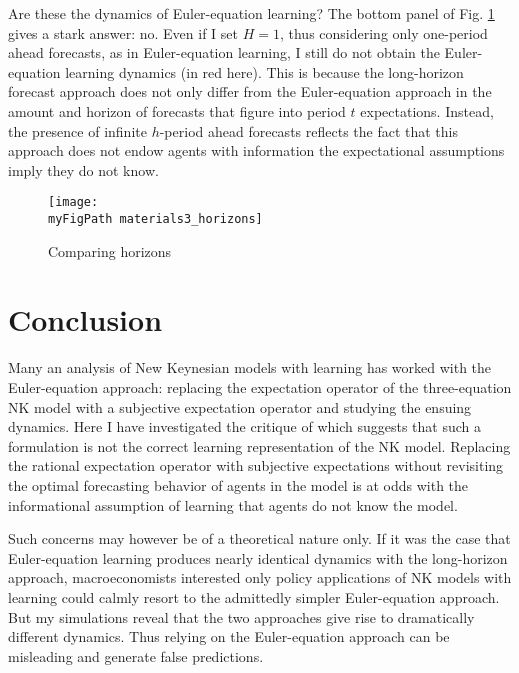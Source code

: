\documentclass[11pt]{article}
\def \myFigPath {../../figures/}
\renewcommand{\[}{\begin{equation}}
\renewcommand{\]}{\end{equation}}
\def\myBiggerFigScale{0.4}
\begin{document}
Are these the dynamics of Euler-equation learning? The bottom panel of Fig. \ref{horizons} gives a stark answer: no. Even if I set $H=1$, thus considering only one-period ahead forecasts, as in Euler-equation learning, I still do not obtain the Euler-equation learning dynamics (in red here). This is because the long-horizon forecast approach does not only differ from the Euler-equation approach in the amount and horizon of forecasts that figure into period $t$ expectations.  Instead, the presence of infinite $h$-period ahead forecasts reflects the fact that this approach does not endow agents with information the expectational assumptions imply they do not know. 

\begin{figure}[h!]
\texttt{[image: \\myFigPath materials3\_horizons]}
\caption{Comparing horizons}
\label{horizons}
\end{figure}

\section{Conclusion}
Many an analysis of New Keynesian models with learning has worked with the Euler-equation approach: replacing the expectation operator of the three-equation NK model with a subjective expectation operator and studying the ensuing dynamics. Here I have investigated the critique of \cite{preston2005} which suggests that such a formulation is not the correct learning representation of the NK model. Replacing the rational expectation operator with subjective expectations without revisiting the optimal forecasting behavior of agents in the model is at odds with the informational assumption of learning that agents do not know the model. 

Such concerns may however be of a theoretical nature only. If it was the case that Euler-equation learning produces nearly identical dynamics with the long-horizon approach, macroeconomists interested only policy applications of NK models with learning could calmly resort to the admittedly simpler Euler-equation approach. But my simulations reveal that the two approaches give rise to dramatically different dynamics. Thus relying on the Euler-equation approach can be misleading and generate false predictions. 

\newpage


\nocite{*}
\end{document}
